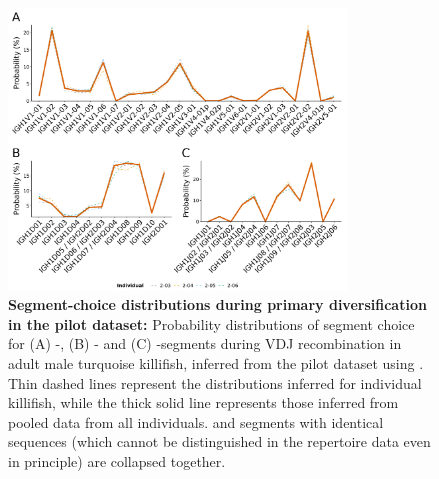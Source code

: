 \begin{figure}
\centering
\includegraphics[width = 0.8\textwidth]{_Figures/png/pilot-igor-segments}
\caption[Segment-choice distributions during primary diversification in the pilot dataset]
{\textbf{Segment-choice distributions during primary diversification in the pilot dataset:} Probability distributions of segment choice for (A) \vh-, (B) \dh- and (C) \jh-segments during VDJ recombination in adult male turquoise killifish, inferred from the \igseq pilot dataset using . Thin dashed lines represent the distributions inferred for individual killifish, while the thick solid line represents those inferred from pooled data from all individuals. \dh and \jh segments with identical sequences (which cannot be distinguished in the repertoire data even in principle) are collapsed together.}
\label{fig:igseq-pilot-igor-segments}
\end{figure}

